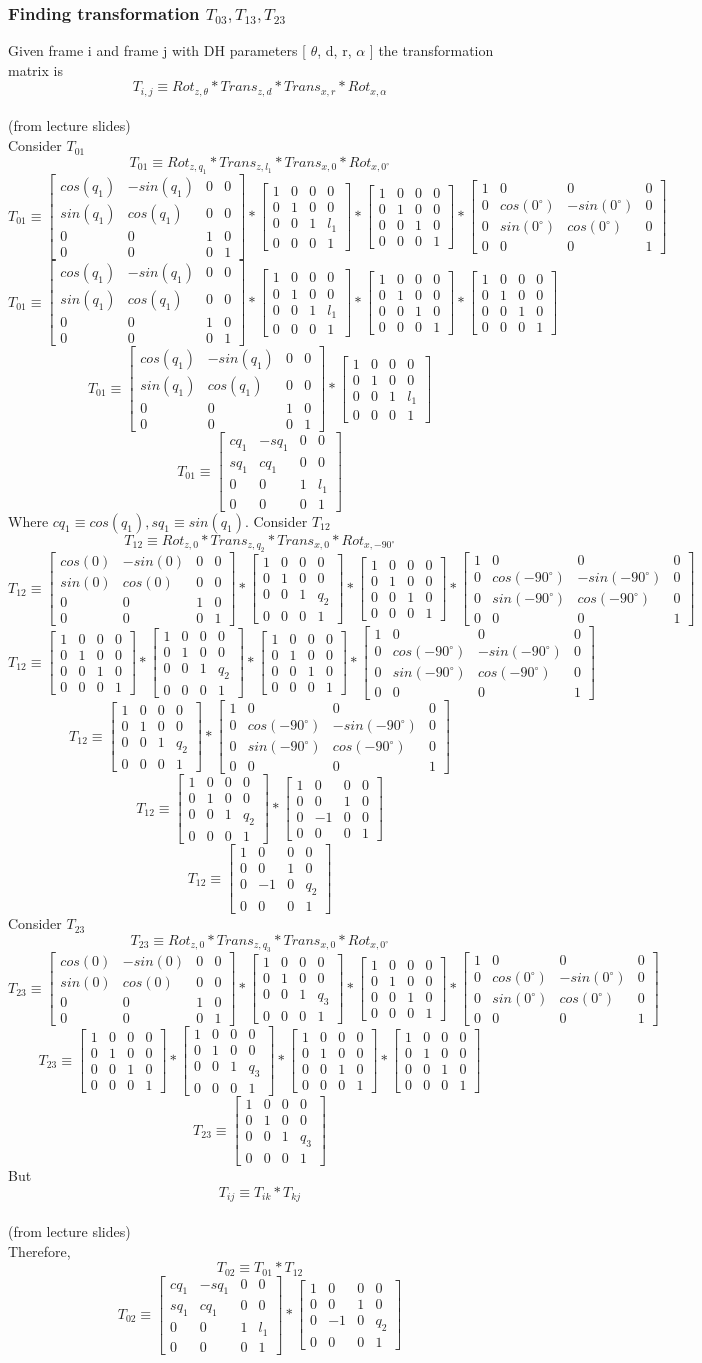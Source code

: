 \documentclass[12pt]{article}
\newcommand{\fromlectures}{{\\ \color{blue} \hspace*{\fill}(from lecture slides)} \\}
\newcommand{\rx}[1]{\begin{bmatrix} 1 & 0 & 0 & 0 \\ 0 & cos(#1) & -sin(#1) & 0 \\ 0 & sin(#1) & cos(#1) & 0 \\ 0 & 0 & 0 & 1 \end{bmatrix}}
\newcommand{\rz}[1]{\begin{bmatrix} cos(#1) & -sin(#1) & 0 & 0 \\ sin(#1) & cos(#1) & 0 & 0 \\ 0 & 0 & 1 & 0 \\ 0 & 0 & 0 & 1 \end{bmatrix}}
\newcommand{\iden}{\begin{bmatrix} 1 & 0 & 0 & 0 \\ 0 & 1 & 0 & 0 \\ 0 & 0 & 1 & 0 \\ 0 & 0 & 0 & 1 \end{bmatrix}}
\newcommand{\trans}[3]{\begin{bmatrix} 1 & 0 & 0 & #1 \\ 0 & 1 & 0 & #2 \\ 0 & 0 & 1 & #3 \\ 0 & 0 & 0 & 1 \end{bmatrix}}
\begin{document}
\subsubsection*{Finding transformation $T_{03}, T_{13}, T_{23}$}
Given frame i and frame j with DH parameters [ $\theta$, d, r, $\alpha$ ] the transformation matrix is
\[
  T_{i,j} \equiv Rot_{z,\theta} * Trans_{z, d} * Trans_{x, r} * Rot_{x, \alpha}
\]
\fromlectures
Consider $T_{01}$
\[
  T_{01} \equiv Rot_{z,q_1} * Trans_{z, l_1} * Trans_{x, 0} * Rot_{x, 0^{\circ}}
\]
\[
  T_{01} \equiv \rz{q_1} * \trans{0}{0}{l_1} * \trans{0}{0}{0} * \rx{0^{\circ}}
\]
\[
  T_{01} \equiv \rz{q_1} * \trans{0}{0}{l_1} * \iden * \iden
\]
\[
  T_{01} \equiv \rz{q_1} * \trans{0}{0}{l_1}
\]
\[
  T_{01} \equiv
  \begin{bmatrix}
    cq_1 & -sq_1 & 0 & 0 \\
    sq_1 & cq_1 & 0 & 0 \\
    0 & 0 & 1 & l_1 \\
    0 & 0 & 0 & 1
  \end{bmatrix}
\]
Where $cq_1 \equiv cos(q_1), sq_1 \equiv sin(q_1)$.
Consider $T_{12}$
\[
  T_{12} \equiv Rot_{z, 0} * Trans_{z, q_2} * Trans_{x, 0} * Rot_{x, -90^{\circ}}
\]
\[
  T_{12} \equiv \rz{0} * \trans{0}{0}{q_2} * \trans{0}{0}{0} * \rx{-90^{\circ}}
\]
\[
  T_{12} \equiv \iden * \trans{0}{0}{q_2} * \trans{0}{0}{0} * \rx{-90^{\circ}}
\]
\[
  T_{12} \equiv \trans{0}{0}{q_2} * \rx{-90^{\circ}}
\]
\[
  T_{12} \equiv \trans{0}{0}{q_2}
  *
  \begin{bmatrix}
    1 & 0 & 0 & 0 \\
    0 & 0 & 1 & 0 \\
    0 & -1 & 0 & 0 \\
    0 & 0 & 0 & 1
  \end{bmatrix}
\]
\[
  T_{12} \equiv
  \begin{bmatrix}
    1 & 0 & 0 & 0 \\
    0 & 0 & 1 & 0 \\
    0 & -1 & 0 & q_2 \\
    0 & 0 & 0 & 1
  \end{bmatrix}
\]
Consider $T_{23}$
\[
  T_{23} \equiv Rot_{z, 0} * Trans_{z, q_3} * Trans_{x, 0} * Rot_{x, 0^{\circ}}
\]
\[
  T_{23} \equiv \rz{0} * \trans{0}{0}{q_3} * \trans{0}{0}{0} * \rx{0^{\circ}}
\]
\[
  T_{23} \equiv \iden * \trans{0}{0}{q_3} * \trans{0}{0}{0} * \iden
\]
\[
  T_{23} \equiv \trans{0}{0}{q_3}
\]
But
\[
  T_{ij} \equiv T_{ik} * T_{kj}
\]
\fromlectures
Therefore,
\[
  T_{02} \equiv T_{01} * T_{12}
\]
\[
  T_{02} \equiv
  \begin{bmatrix}
    cq_1 & -sq_1 & 0 & 0 \\
    sq_1 & cq_1 & 0 & 0 \\
    0 & 0 & 1 & l_1 \\
    0 & 0 & 0 & 1
  \end{bmatrix}
  *
  \begin{bmatrix}
    1 & 0 & 0 & 0 \\
    0 & 0 & 1 & 0 \\
    0 & -1 & 0 & q_2 \\
    0 & 0 & 0 & 1
  \end{bmatrix}
\]
\end{document}
